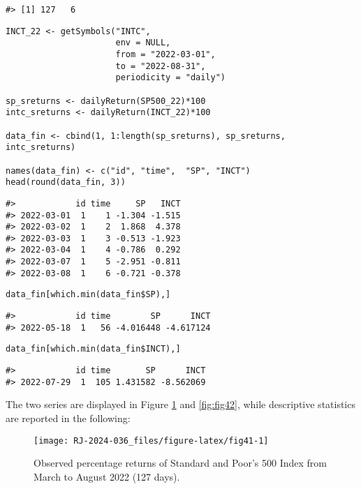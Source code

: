 \begin{verbatim}
#> [1] 127   6
\end{verbatim}

\begin{verbatim}
INCT_22 <- getSymbols("INTC",
                      env = NULL,
                      from = "2022-03-01",
                      to = "2022-08-31",
                      periodicity = "daily")

sp_sreturns <- dailyReturn(SP500_22)*100
intc_sreturns <- dailyReturn(INCT_22)*100

data_fin <- cbind(1, 1:length(sp_sreturns), sp_sreturns, intc_sreturns)

names(data_fin) <- c("id", "time",  "SP", "INCT") 
head(round(data_fin, 3))
\end{verbatim}

\begin{verbatim}
#>            id time     SP   INCT
#> 2022-03-01  1    1 -1.304 -1.515
#> 2022-03-02  1    2  1.868  4.378
#> 2022-03-03  1    3 -0.513 -1.923
#> 2022-03-04  1    4 -0.786  0.292
#> 2022-03-07  1    5 -2.951 -0.811
#> 2022-03-08  1    6 -0.721 -0.378
\end{verbatim}

\begin{verbatim}
data_fin[which.min(data_fin$SP),]
\end{verbatim}

\begin{verbatim}
#>            id time        SP      INCT
#> 2022-05-18  1   56 -4.016448 -4.617124
\end{verbatim}

\begin{verbatim}
data_fin[which.min(data_fin$INCT),]
\end{verbatim}

\begin{verbatim}
#>            id time       SP      INCT
#> 2022-07-29  1  105 1.431582 -8.562069
\end{verbatim}

The two series are displayed in Figure \ref{fig:fig41} and
\ref{fig:fig42}, while descriptive statistics are reported in the
following:

\begin{figure}

{\centering \texttt{[image: RJ-2024-036\_files/figure-latex/fig41-1]} 

}

\caption{Observed percentage returns of Standard and Poor's 500 Index from  March to August 2022 (127 days).}\label{fig:fig41}
\end{figure}

